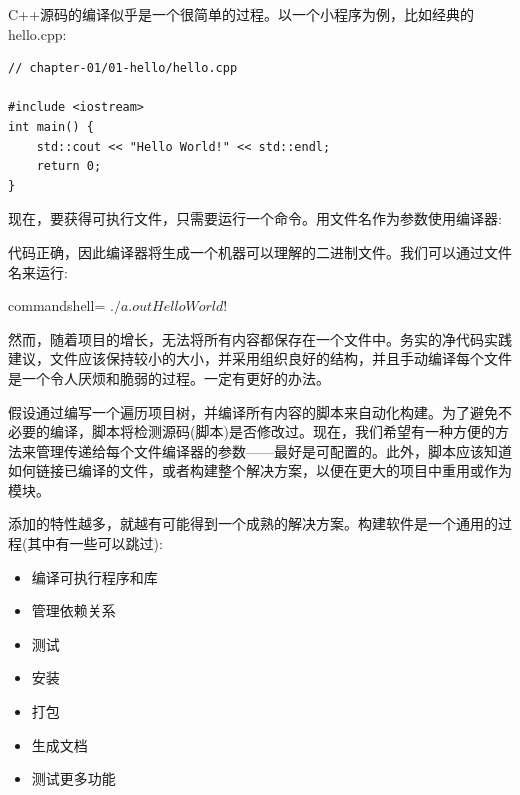 
C++源码的编译似乎是一个很简单的过程。以一个小程序为例，比如经典的hello.cpp:

\begin{lstlisting}[style=styleCXX]
// chapter-01/01-hello/hello.cpp

#include <iostream>
int main() {
	std::cout << "Hello World!" << std::endl;
	return 0;
}
\end{lstlisting}

现在，要获得可执行文件，只需要运行一个命令。用文件名作为参数使用编译器:


代码正确，因此编译器将生成一个机器可以理解的二进制文件。我们可以通过文件名来运行:

\begin{tcblisting}{commandshell={}}
$ ./a.out
Hello World!
$
\end{tcblisting}

然而，随着项目的增长，无法将所有内容都保存在一个文件中。务实的净代码实践建议，文件应该保持较小的大小，并采用组织良好的结构，并且手动编译每个文件是一个令人厌烦和脆弱的过程。一定有更好的办法。


假设通过编写一个遍历项目树，并编译所有内容的脚本来自动化构建。为了避免不必要的编译，脚本将检测源码(脚本)是否修改过。现在，我们希望有一种方便的方法来管理传递给每个文件编译器的参数——最好是可配置的。此外，脚本应该知道如何链接已编译的文件，或者构建整个解决方案，以便在更大的项目中重用或作为模块。

添加的特性越多，就越有可能得到一个成熟的解决方案。构建软件是一个通用的过程(其中有一些可以跳过):

\begin{itemize}
\item 
编译可执行程序和库

\item 
管理依赖关系

\item 
测试

\item 
安装

\item 
打包

\item 
生成文档

\item 
测试更多功能
\end{itemize}

